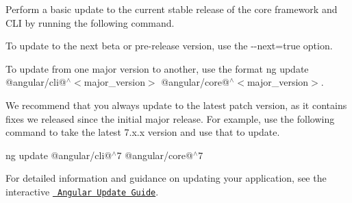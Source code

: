 Perform a basic update to the current stable release of the core framework and CLI by running the following command.


\begin{DoxyCode}{0}

\end{DoxyCode}


To update to the next beta or pre-\/release version, use the {\ttfamily -\/-\/next=true} option.

To update from one major version to another, use the format {\ttfamily ng update @angular/cli@$^\wedge$$<$major\+\_\+version$>$ @angular/core@$^\wedge$$<$major\+\_\+version$>$}.

We recommend that you always update to the latest patch version, as it contains fixes we released since the initial major release. For example, use the following command to take the latest 7.\+x.\+x version and use that to update.

{\ttfamily ng update @angular/cli@$^\wedge$7 @angular/core@$^\wedge$7}

For detailed information and guidance on updating your application, see the interactive \href{https://update.angular.io/}{\texttt{ Angular Update Guide}}. 